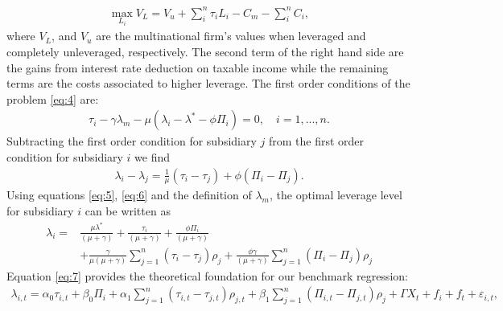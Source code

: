 \documentclass[12pt]{article}
\begin{document}
	 \begin{equation}
	\begin{aligned}
	\max_{L_i}V_L=V_u+\sum_{i}^{n}\tau_iL_i-C_m-\sum_{i}^{n}C_i,
	\end{aligned}
	\label{eq:4}
	\end{equation}
	where $V_L$, and $V_u$ are the multinational firm's values when leveraged and completely unleveraged, respectively. The second term of the right hand side are the gains from interest rate deduction on taxable income while the remaining terms are the costs associated to higher leverage. The first order conditions of the problem \ref{eq:4} are:
	\begin{equation}
	\begin{aligned}
	\tau_i-\gamma\lambda_m-\mu(\lambda_i-\lambda^*-\phi\Pi_i)=0, \quad i=1,...,n.
	\end{aligned}
		\label{eq:5}
	\end{equation}
	Subtracting the first order condition for subsidiary $j$ from the first order condition for subsidiary $i$ we find
	\begin{equation}
	\begin{aligned}
	\lambda_i-\lambda_j=\frac{1}{\mu}(\tau_i-\tau_j)+\phi(\Pi_i-\Pi_j).
	\end{aligned}
	\label{eq:6}
	\end{equation}
	Using equations \ref{eq:5}, \ref{eq:6} and the definition of $\lambda_m$, the optimal leverage level for subsidiary $i$ can be written as  
	\begin{equation}
	\begin{aligned}
	\lambda_i=&\frac{\mu\lambda^*}{(\mu+\gamma)}+\frac{\tau_i}{(\mu+\gamma)}+\frac{\phi\Pi_i}{(\mu+\gamma)}\\
	&+\frac{\gamma}{\mu(\mu+\gamma)}\sum_{j=1}^{n}(\tau_i-\tau_j)\rho_j+\frac{\phi\gamma}{(\mu+\gamma)}\sum_{j=1}^{n}(\Pi_i-\Pi_j)\rho_j
	\end{aligned}
	\label{eq:7}
	\end{equation}
	Equation \ref{eq:7} provides the theoretical foundation for our benchmark regression: 
	\begin{equation}
	\begin{aligned}
	\lambda_{i,t}=\alpha_0\tau_{i,t}+\beta_0\Pi_i+\alpha_1\sum_{j=1}^{n}(\tau_{i,t}-\tau_{j,t})\rho_{j,t}+\beta_1\sum_{j=1}^{n}(\Pi_{i,t}-\Pi_{j,t})\rho_j
	+\Gamma X_{t}+f_{i}+f_{t}+\varepsilon_{i,t},
	\label{eq:8}
	\end{aligned}
	\end{equation}
	
\end{document}
